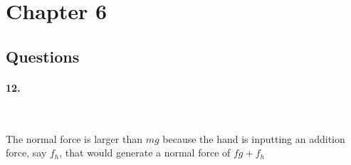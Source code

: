 


\renewcommand\assignment{HW 5, Due Friday, 2/23/2023 23:59; \S5 Q: \#12, 15, 16 P: \#26, 41, 46, 52, 53  \S4 P: \#25, 33}
\setlength{\belowdisplayskip}{0pt} \setlength{\belowdisplayshortskip}{0pt}
\setlength{\abovedisplayskip}{0pt} \setlength{\abovedisplayshortskip}{0pt}



    \iffalse
    \begin{equation*}
        \begin{gathered}
            Equations go here.
        \end{gathered}
    \end{equation*}

    \resizebox{\hsize}{!}{$Long equation goes here$}

    \begin{multicol*}{# of columns}
    \end{multicol*}

    \horizontal

    \fi


    \section*{Chapter 6}

    \subsection*{Questions}
    
    \paragraph*{12.}\mbox{}
    \\
    \begin{mdframed}
        The normal force is larger than $mg$ because the hand is inputting an addition force, say $f_{h}$, that would generate a normal force of $fg + f_{h}$
    \end{mdframed}

